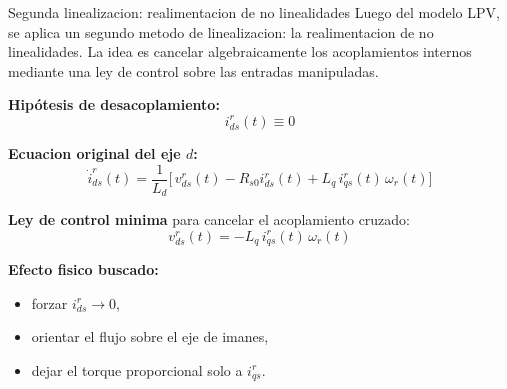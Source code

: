 \documentclass[aspectratio=169,t]{beamer}
\begin{document}
\begin{frame}{Segunda linealizacion: realimentacion de no linealidades}
{\small\color{uncGray}Luego del modelo LPV, se aplica un segundo metodo de linealizacion: la realimentacion de no linealidades. La idea es cancelar algebraicamente los acoplamientos internos mediante una ley de control sobre las entradas manipuladas.}\par
\vspace{3mm}

\textbf{Hipótesis de desacoplamiento:}
\begin{equation*}
i_{ds}^{r}(t)\equiv 0
\end{equation*}

\textbf{Ecuacion original del eje $d$:}
\begin{equation*}
\dot{i}_{ds}^{r}(t)=\frac{1}{L_d}\Big[\,v_{ds}^{r}(t)-R_{s0}i_{ds}^{r}(t)+L_q\,i_{qs}^{r}(t)\,\omega_r(t)\Big]
\end{equation*}

\textbf{Ley de control minima} para cancelar el acoplamiento cruzado:
\begin{equation*}
\boxed{\;v_{ds}^{r}(t)=-L_q\,i_{qs}^{r}(t)\,\omega_r(t)\;}
\end{equation*}

\textbf{Efecto fisico buscado:}
\begin{itemize}
  \item forzar $i_{ds}^{r}\to 0$,
  \item orientar el flujo sobre el eje de imanes,
  \item dejar el torque proporcional solo a $i_{qs}^{r}$.
\end{itemize}
\end{frame}
\end{document}
